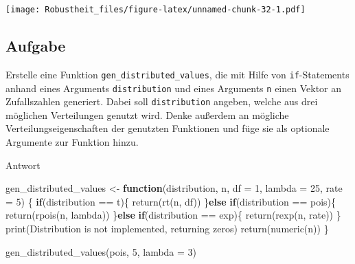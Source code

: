 \documentclass[
]{book}
\newenvironment{Shaded}{\begin{snugshade}}{\end{snugshade}}
\newcommand{\AttributeTok}[1]{\textcolor[rgb]{0.77,0.63,0.00}{#1}}
\newcommand{\ControlFlowTok}[1]{\textcolor[rgb]{0.13,0.29,0.53}{\textbf{#1}}}
\newcommand{\DecValTok}[1]{\textcolor[rgb]{0.00,0.00,0.81}{#1}}
\newcommand{\FunctionTok}[1]{\textcolor[rgb]{0.00,0.00,0.00}{#1}}
\newcommand{\NormalTok}[1]{#1}
\newcommand{\OtherTok}[1]{\textcolor[rgb]{0.56,0.35,0.01}{#1}}
\newcommand{\SpecialCharTok}[1]{\textcolor[rgb]{0.00,0.00,0.00}{#1}}
\newcommand{\StringTok}[1]{\textcolor[rgb]{0.31,0.60,0.02}{#1}}
\begin{document}
\texttt{[image: Robustheit\_files/figure-latex/unnamed-chunk-32-1.pdf]}

\hypertarget{aufgabe-3}{%
\subsection{Aufgabe}\label{aufgabe-3}}

Erstelle eine Funktion \texttt{gen\_distributed\_values}, die mit Hilfe von \texttt{if}-Statements anhand eines Arguments \texttt{distribution} und eines Arguments \texttt{n} einen Vektor an Zufallszahlen generiert. Dabei soll \texttt{distribution} angeben, welche aus drei möglichen Verteilungen genutzt wird. Denke außerdem an mögliche Verteilungseigenschaften der genutzten Funktionen und füge sie als optionale Argumente zur Funktion hinzu.

Antwort

\begin{Shaded}
\begin{Highlighting}[]
\NormalTok{gen\_distributed\_values }\OtherTok{\textless{}{-}} \ControlFlowTok{function}\NormalTok{(distribution,}
\NormalTok{                                   n,}
                                   \AttributeTok{df =} \DecValTok{1}\NormalTok{,}
                                   \AttributeTok{lambda =} \DecValTok{25}\NormalTok{,}
                                   \AttributeTok{rate =} \DecValTok{5}\NormalTok{) \{}
  \ControlFlowTok{if}\NormalTok{(distribution }\SpecialCharTok{==} \StringTok{\textquotesingle{}t\textquotesingle{}}\NormalTok{)\{}
    \FunctionTok{return}\NormalTok{(}\FunctionTok{rt}\NormalTok{(n, df))}
\NormalTok{  \}}\ControlFlowTok{else} \ControlFlowTok{if}\NormalTok{(distribution }\SpecialCharTok{==} \StringTok{\textquotesingle{}pois\textquotesingle{}}\NormalTok{)\{}
    \FunctionTok{return}\NormalTok{(}\FunctionTok{rpois}\NormalTok{(n, lambda))}
\NormalTok{  \}}\ControlFlowTok{else} \ControlFlowTok{if}\NormalTok{(distribution }\SpecialCharTok{==} \StringTok{\textquotesingle{}exp\textquotesingle{}}\NormalTok{)\{}
    \FunctionTok{return}\NormalTok{(}\FunctionTok{rexp}\NormalTok{(n, rate))}
\NormalTok{  \}}
  \FunctionTok{print}\NormalTok{(}\StringTok{\textquotesingle{}Distribution is not implemented, returning zeros\textquotesingle{}}\NormalTok{)}
  \FunctionTok{return}\NormalTok{(}\FunctionTok{numeric}\NormalTok{(n))}
\NormalTok{\}}

\FunctionTok{gen\_distributed\_values}\NormalTok{(}\StringTok{\textquotesingle{}pois\textquotesingle{}}\NormalTok{,}
                       \DecValTok{5}\NormalTok{,}
                       \AttributeTok{lambda =} \DecValTok{3}\NormalTok{)}
\end{Highlighting}
\end{Shaded}
\end{document}
